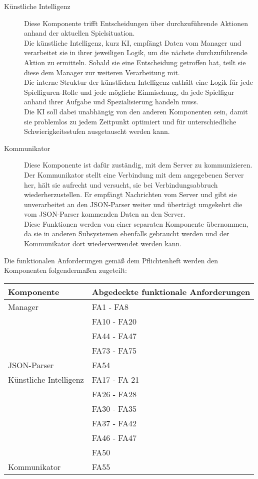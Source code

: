\begin{description}
	\item[Künstliche Intelligenz] 
	Diese Komponente trifft Entscheidungen über durchzuführende Aktionen anhand der aktuellen Spielsituation.\\
	Die künstliche Intelligenz, kurz KI, empfängt Daten vom Manager und verarbeitet sie in ihrer jeweiligen Logik, um die nächste durchzuführende Aktion zu ermitteln. Sobald sie eine Entscheidung getroffen hat, teilt sie diese dem Manager zur weiteren Verarbeitung mit.\\
	Die interne Struktur der künstlichen Intelligenz enthält eine Logik für jede Spielfiguren-Rolle und jede mögliche Einmischung, da jede Spielfigur anhand ihrer Aufgabe und Spezialisierung handeln muss.\\
	Die KI soll dabei unabhängig von den anderen Komponenten sein, damit sie problemlos zu jedem Zeitpunkt optimiert und für unterschiedliche Schwierigkeitsstufen ausgetauscht werden kann.
	\\
	\item[Kommunikator]
	Diese Komponente ist dafür zuständig, mit dem Server zu kommunizieren.\\
	Der Kommunikator stellt eine Verbindung mit dem angegebenen Server her, hält sie aufrecht und versucht, sie bei Verbindungsabbruch wiederherzustellen. Er empfängt Nachrichten vom Server und gibt sie unverarbeitet an den JSON-Parser weiter und überträgt umgekehrt die vom JSON-Parser kommenden Daten an den Server.\\
	Diese Funktionen werden von einer separaten Komponente übernommen, da sie in anderen Subsystemen ebenfalls gebraucht werden und der Kommunikator dort wiederverwendet werden kann. 
\end{description}

Die funktionalen Anforderungen gemäß dem Pflichtenheft werden den Komponenten folgendermaßen zugeteilt:

\begin{center}
	\begin{tabular}{|l|l|}
		\hline
		\textbf{Komponente} & \textbf{Abgedeckte funktionale Anforderungen}\\\hline
		Manager & FA1 - FA8\\
		& FA10 - FA20\\
		& FA44 - FA47\\
		& FA73 - FA75\\\hline
		JSON-Parser & FA54\\\hline
		Künstliche Intelligenz & FA17 - FA 21\\
		& FA26 - FA28\\
		& FA30 - FA35\\
		& FA37 - FA42\\
		&FA46 - FA47\\
		&FA50\\\hline
		Kommunikator & FA55\\\hline
		
	\end{tabular}
\end{center}
